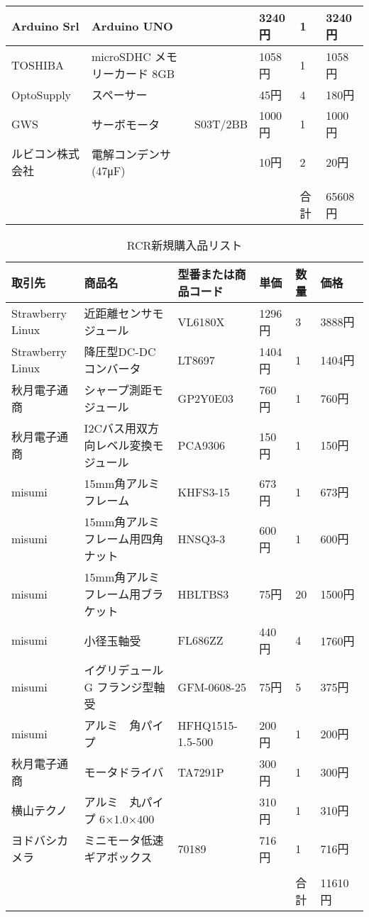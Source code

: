 \begin{table}[htb]
\begin{tabular}{|l|l|l|l|l|l|}
   Arduino Srl & Arduino UNO & & 3240円 & 1 & 3240円  \\     \hline
   TOSHIBA & microSDHC メモリーカード 8GB & & 1058円 & 1 & 1058円  \\    \hline
   OptoSupply & スペーサー &　& 45円 & 4 & 180円  \\     \hline
   GWS &サーボモータ & S03T/2BB & 1000円 & 1 & 1000円  \\    \hline
   ルビコン株式会社 & 電解コンデンサ(47μF) &  &10円 & 2 &20円 \\     \hline
  \\   \hline
 &  & & &合計 & 65608円  \\   \hline
 \end{tabular}
\end{table}

\newpage
\begin{table}[htb]
\centering
  \caption{RCR新規購入品リスト}
  \begin{tabular}{|l|l|l|l|l|l|}  \hline
  取引先 & 商品名 & 型番または商品コード & 単価 & 数量 & 価格　\\   \hline \hline
  Strawberry Linux & 近距離センサモジュール & VL6180X & 1296円 & 3 & 3888円 \\    \hline
  Strawberry Linux & 降圧型DC-DCコンバータ & LT8697 & 1404円 & 1 & 1404円  \\      \hline
  秋月電子通商 & シャープ測距モジュール & GP2Y0E03 & 760円 & 1 & 760円  \\      \hline
  秋月電子通商 & I2Cバス用双方向レベル変換モジュール & PCA9306 & 150円 & 1 & 150円  \\      \hline
  misumi & 15mm角アルミフレーム & KHFS3-15 & 673円 & 1 & 673円  \\      \hline
  misumi & 15mm角アルミフレーム用四角ナット & HNSQ3-3 & 600円 & 1 & 600円  \\       \hline
  misumi & 15mm角アルミフレーム用ブラケット & HBLTBS3 & 75円 & 20 & 1500円  \\      \hline
  misumi & 小径玉軸受 & FL686ZZ & 440円 & 4 & 1760円  \\      \hline
  misumi & イグリデュールG フランジ型軸受 & GFM-0608-25 & 75円 & 5 & 375円 \\     \hline
  misumi & アルミ　角パイプ & HFHQ1515-1.5-500 & 200円 & 1 & 200円  \\       \hline
  秋月電子通商 & モータドライバ & TA7291P & 300円 & 1 & 300円　　\\      \hline
  横山テクノ & アルミ　丸パイプ 6×1.0×400 &　& 310円 & 1 & 310円　\\        \hline
  ヨドバシカメラ & ミニモータ低速ギアボックス & 70189 & 716円 & 1 & 716円  \\      \hline
 \\      \hline
 & & & & 合計 & 11610円  \\      \hline


 \end{tabular}
\end{table}
